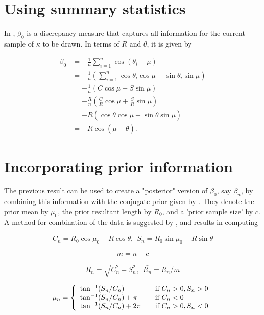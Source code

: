 \documentclass[12pt,a4paper]{article}
\begin{document}
\section*{Using summary statistics}

In \citet{forbes2014fast}, $\beta_0$ is a discrepancy measure that captures all information for the current sample of $\kappa$ to be drawn. In terms of $\bar{R}$ and $\bar{\theta}$, it is given by

\begin{align*}
\beta_0 & = - \frac{1}{n} \sum_{i=1}^{n} \cos(\theta_i - \mu) \\
& = - \frac{1}{n} \left( \sum_{i=1}^{n} \cos\theta_i\cos\mu + \sin\theta_i\sin\mu \right) \\
& = - \frac{1}{n} \left( C \cos\mu + S \sin\mu \right) \\
& = - \frac{R}{n} \left( \frac{C}{R} \cos\mu + \frac{S}{R} \sin\mu \right) \\
& = - \bar{R} \left( \cos\bar{\theta} \cos\mu + \sin\bar{\theta} \sin\mu \right) \\
& = - \bar{R} \cos \left( \mu - \bar\theta \right).
\end{align*}

\section*{Incorporating prior information}

The previous result can be used to create a "posterior" version of $\beta_0$, say $\beta_n$, by combining this information with the conjugate prior given by \citet{guttorp1988finding}. They denote the prior mean by $\mu_0$, the prior resultant length by $R_0$, and a 'prior sample size' by $c$. A method for combination of the data  is suggested by \citet{damien1999fullbayes}, and results in computing 

$$C_n = R_0 \cos\mu_0 + R\cos\bar{\theta}, ~~ S_n = R_0 \sin\mu_0 + R\sin\bar{\theta}$$

$$m = n + c$$

$$ R_n = \sqrt{C_n^2 + S_n^2}, ~~ \bar{R_n} = R_n/m $$

$$ \mu_n = \left\{ 
  \begin{array}{l l}
   \tan^{-1} (S_n/C_n) & \quad \textnormal{if}~ \text{$C_n > 0, S_n > 0$}\\
   \tan^{-1} (S_n/C_n) + \pi & \quad \textnormal{if}~ \text{$C_n < 0$}\\ 
   \tan^{-1} (S_n/C_n) + 2\pi & \quad \textnormal{if}~ \text{$C_n > 0, S_n < 0$}
  \end{array} \right.$$
\end{document}
